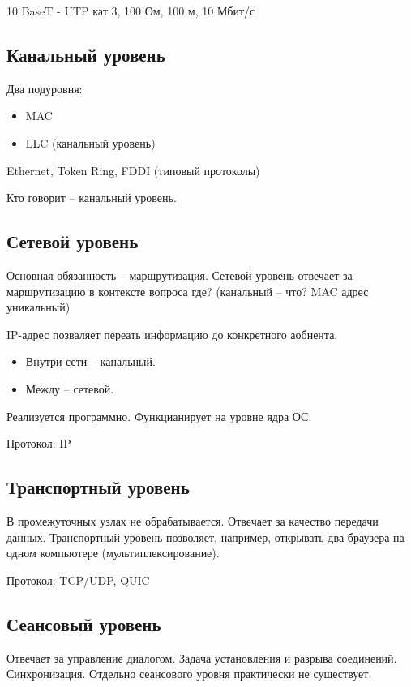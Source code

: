 10 BaseT - UTP кат 3, 100 Ом, 100 м, 10 Мбит/с

\subsection{Канальный уровень}

Два подуровня:
\begin{itemize}
    \item MAC
    \item LLC (канальный уровень)
\end{itemize}

Ethernet, Token Ring, FDDI (типовый протоколы)

Кто говорит – канальный уровень.

\subsection{Сетевой уровень}

Основная обязанность – маршрутизация. Сетевой уровень отвечает за маршрутизацию в контексте вопроса где? (канальный – что? MAC адрес уникальный)

IP-адрес позваляет переать информацию до конкретного аобнента.

\begin{itemize}
    \item Внутри сети – канальный.
    \item Между – сетевой.
\end{itemize}

Реализуется программно. Функцианирует на уровне ядра ОС.

Протокол: IP

\subsection{Транспортный уровень}

В промежуточных узлах не обрабатывается. Отвечает за качество передачи данных. Транспортный уровень позволяет, например, открывать два браузера на одном компьютере (мультиплексирование).

Протокол: TCP/UDP, QUIC

\subsection{Сеансовый уровень}

Отвечает за управление диалогом. Задача установления и разрыва соединений. Синхронизация. Отдельно сеансового уровня практически не существует.

